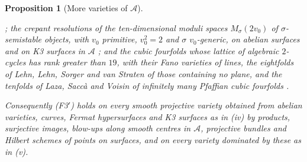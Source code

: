 \documentclass[11pt,reqno]{amsart}
\theoremstyle{plain}
\newtheorem{proposition}[theorem]{Proposition}
\theoremstyle{definition}
\theoremstyle{remark}
\begin{document}
\begin{proposition}[More varieties of $\mathcal{A}$]
\begin{enumerate}[label=\textup{(\roman*)},leftmargin=2.6em,itemsep=2pt]
  \cite[Theorem~1.1]{Flo23}; the crepant resolutions of the ten-dimensional
  moduli spaces $M_{\sigma}(2v_{0})$ of $\sigma$-semistable objects, with
  $v_{0}$ primitive, $v_{0}^{2}=2$ and $\sigma$ $v_{0}$-generic, on abelian
  surfaces and on K3 surfaces in $\mathcal{A}$
  \cite[Theorem~1.3, Corollary~4.5]{FFZ21}; and the cubic fourfolds whose
  lattice of algebraic $2$-cycles has rank greater than $19$, with their Fano
  varieties of lines, the eightfolds of Lehn, Lehn, Sorger and van Straten of
  those containing no plane, and the tenfolds of Laza, Sacc\`a and Voisin of
  infinitely many Pfaffian cubic fourfolds \cite[Theorem~3.5 and its proof,
  Proposition~3.9, Theorem~4.2]{ABLP26}.
\end{enumerate}
Consequently \textup{(F3$'$)} holds on every smooth projective variety
obtained from abelian varieties, curves, Fermat hypersurfaces and K3 surfaces
as in \textup{(iv)} by products, surjective images, blow-ups along smooth
centres in $\mathcal{A}$, projective bundles and Hilbert schemes of points on
surfaces, and on every variety dominated by these as in \textup{(v)}.
\end{proposition}
\end{document}
